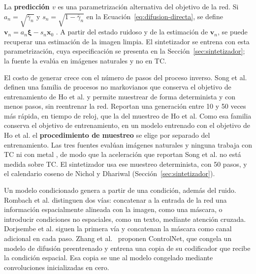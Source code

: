 La \textbf{predicción $v$} es una parametrización alternativa del objetivo de la red. Si $a_n=\sqrt{\bar{\gamma}_n}$ y $s_n=\sqrt{1-\bar{\gamma}_n}$ en la Ecuación~\ref{eq:difusion-directa}, se define $\mathbf{v}_n=a_n\boldsymbol{\xi}-s_n\mathbf{x}_0$ \cite{salimans2022progressive}. A partir del estado ruidoso y de la estimación de $\mathbf{v}_n$, se puede recuperar una estimación de la imagen limpia. El sintetizador se entrena con esta parametrización, cuya especificación se presenta en la Sección~\ref{sec:sintetizador}; la fuente la evalúa en imágenes naturales y no en TC.

El costo de generar crece con el número de pasos del proceso inverso. Song et al. definen una familia de procesos no markovianos que conserva el objetivo de entrenamiento de Ho et al. y permite muestrear de forma determinista y con menos pasos, sin reentrenar la red. Reportan una generación entre 10 y 50 veces más rápida, en tiempo de reloj, que la del muestreo de Ho et al. Como esa familia conserva el objetivo de entrenamiento, en un modelo entrenado con el objetivo de Ho et al. el \textbf{procedimiento de muestreo} se elige por separado del entrenamiento. Las tres fuentes evalúan imágenes naturales y ninguna trabaja con TC ni con metal \cite{ho2020denoising,song2021ddim,nichol2021improved}, de modo que la aceleración que reportan Song et al. no está medida sobre TC. El sintetizador usa ese muestreo determinista, con 50 pasos, y el calendario coseno de Nichol y Dhariwal (Sección~\ref{sec:sintetizador}).

Un modelo condicionado genera a partir de una condición, además del ruido. Rombach et al. distinguen dos vías: concatenar a la entrada de la red una información espacialmente alineada con la imagen, como una máscara, o introducir condiciones no espaciales, como un texto, mediante atención cruzada. Dorjsembe et al. siguen la primera vía y concatenan la máscara como canal adicional en cada paso. Zhang et al.~\cite{zhang2023controlnet} proponen ControlNet, que congela un modelo de difusión preentrenado y entrena una copia de su codificador que recibe la condición espacial. Esa copia se une al modelo congelado mediante convoluciones inicializadas en cero.

